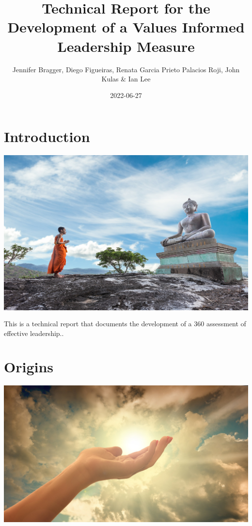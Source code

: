 \documentclass[
]{book}
\title{Technical Report for the Development of a Values Informed Leadership Measure}
\author{Jennifer Bragger, Diego Figueiras, Renata Garcia Prieto Palacios Roji, John Kulas \& Ian Lee}
\date{2022-06-27}
\begin{document}
\maketitle

{
\setcounter{tocdepth}{1}
\tableofcontents
}
\hypertarget{introduction}{%
\chapter{Introduction}\label{introduction}}

\includegraphics{monk-g0dbed9dae_1920.jpg}

This is a technical report that documents the development of a 360 assessment of effective leadership..

\hypertarget{origins}{%
\chapter{Origins}\label{origins}}

\includegraphics{religion-g96a8473e7_1920.jpg}
\end{document}
